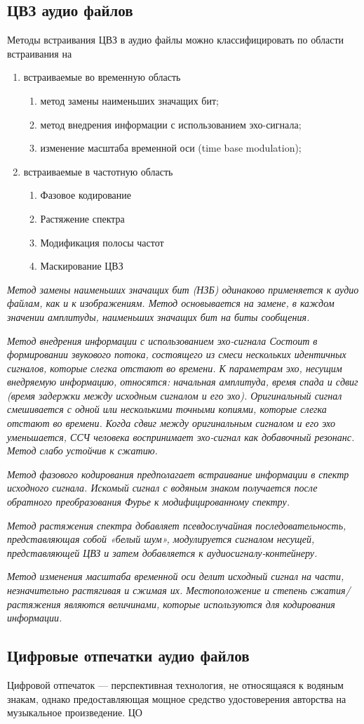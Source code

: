 \documentclass{report}
\begin{document}
\subsection{ЦВЗ аудио файлов}
\par  Методы встраивания ЦВЗ в аудио файлы можно классифицировать по области встраивания \cite{борисова2015} на
\begin{enumerate}
\item встраиваемые во временную область
		\begin{enumerate}
			\item метод замены наименьших значащих бит;
			\item метод внедрения информации с использованием эхо-сигнала;
			\item изменение масштаба временной оси (time base modulation);
		\end{enumerate}
\item встраиваемые в частотную область
		\begin{enumerate}
			\item Фазовое кодирование
			\item Растяжение спектра
			\item Модификация полосы частот
			\item Маскирование ЦВЗ
		\end{enumerate}
\end{enumerate} 
\par \it {Метод замены наименьших значащих бит (НЗБ)} одинаково применяется к аудио файлам, как и к изображениям. Метод основывается на замене, в каждом значении амплитуды, наименьших значащих бит на биты сообщения. 
\par \it {Метод внедрения информации с использованием эхо-сигнала} Состоит в формировании звукового потока, состоящего из смеси нескольких идентичных сигналов, которые слегка отстают во времени. К параметрам эхо, несущим внедряемую
информацию, относятся: начальная амплитуда, время спада и сдвиг (время задержки между исходным сигналом и его эхо). Оригинальный сигнал смешивается с одной или несколькими точными копиями, которые слегка отстают во времени. Когда сдвиг
между оригинальным сигналом и его эхо уменьшается, ССЧ человека воспринимает эхо-сигнал как добавочный резонанс. Метод слабо устойчив к сжатию.
\par \it {Метод фазового кодирования} предполагает встраивание информации в спектр исходного сигнала. Искомый сигнал с водяным знаком получается после обратного преобразования Фурье к модифицированному спектру.
 \par \it {Метод растяжения спектра} добавляет псевдослучайная последовательность, представляющая собой «белый шум», модулируется сигналом несущей, представляющей ЦВЗ и затем добавляется к аудиосигналу-контейнеру.
 \par \it Метод {изменения масштаба временной оси}  делит исходный сигнал на части, незначительно
 растягивая и сжимая  их. Местоположение и степень сжатия/растяжения являются величинами, которые используются для кодирования информации.
 
 \subsection{Цифровые отпечатки аудио файлов}
 \par Цифровой отпечаток --- перспективная технология, не относящаяся к водяным знакам, однако предоставляющая мощное средство удостоверения авторства на музыкальное произведение. ЦО 
 
\end{document}
